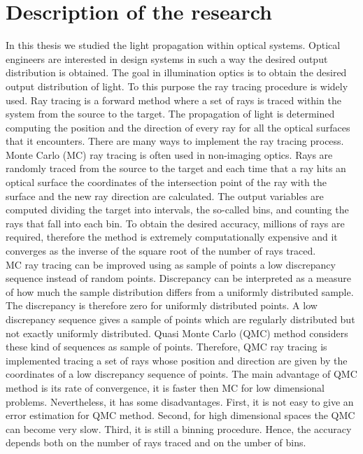 \chapter*{Description of the research}
\pagestyle{empty}
In this thesis we studied the light propagation within optical systems.
Optical engineers are interested in design systems in such a way the desired output distribution is obtained.
The goal in illumination optics is to obtain the desired output distribution of light. To this purpose the ray tracing procedure is widely used. Ray tracing is a forward method where a set of rays is traced within the system from the source to the target. The propagation of light is determined computing the position and the direction of every ray for all the optical surfaces that it encounters. There are many ways to implement the ray tracing process. Monte Carlo (MC) ray tracing is often used in non-imaging optics. Rays are randomly traced from the source to the target and each time that a ray hits an optical surface the coordinates of the intersection point of the ray with the surface and the new ray direction are calculated. The output variables are computed dividing the target into intervals, the so-called bins, and counting the rays that fall into each bin. To obtain the desired accuracy, millions of rays are required, therefore the method is extremely computationally expensive and it converges as the inverse of the square root of the number of rays traced. 
\\ \indent 
MC ray tracing can be improved using as sample of points a low discrepancy sequence instead of random points. Discrepancy can be interpreted as a measure of how much the sample distribution differs from a uniformly distributed sample. The discrepancy is therefore zero for uniformly distributed points. A low discrepancy sequence gives a sample of points which are regularly distributed but not exactly uniformly distributed. Quasi Monte Carlo (QMC) method considers these kind of sequences as sample of points. Therefore, QMC ray tracing is implemented tracing a set of rays whose position and direction are given by the coordinates of a low discrepancy sequence of points.
The main advantage of QMC method is its rate of convergence, it is faster then MC for low dimensional problems. Nevertheless, it has some disadvantages. First, it is not easy to give an error estimation for QMC method. Second, for high dimensional spaces the QMC can become very slow. Third, it is still a binning procedure. Hence, the accuracy depends both on the number of rays traced and on the umber of bins.
